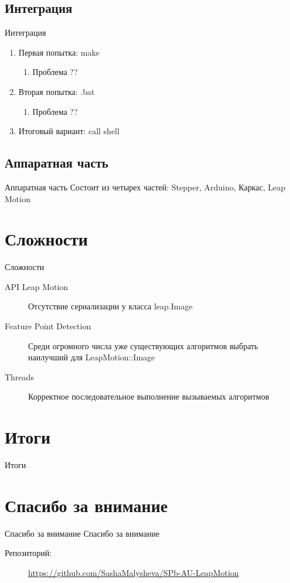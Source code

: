 \documentclass{beamer}
\newcommand{\cimg}[2]{%
	\begin{center}%
		\ifthenelse{\equal{#2}{}}{%
			\texttt{[image: \#1]}
		}{%
			\texttt{[image: \#1]}
		}%
	\end{center}%
}
\begin{document}
\subsection{Интеграция}
\begin{frame}[t]{Интеграция}
	\begin{enumerate}
		\item
		Первая попытка: make
		\begin{enumerate}
			\item Проблема ??
		\end{enumerate}

	\item
		Вторая попытка: .bat
		\begin{enumerate}
			\item Проблема ??
		\end{enumerate}

	\item
		Итоговый вариант: call shell
	\end{enumerate}
\end{frame}

\subsection{Аппаратная часть}
\begin{frame}[t]{Аппаратная часть}
		Состоит из четырех частей: Stepper, Arduino, Каркас, Leap Motion
		\cimg{03.png}{0.6}
\end{frame}

\section{Сложности}
\begin{frame}[t]{Сложности}
	\begin{description}
		\item[API Leap Motion]
			Отсутствие сериализации у класса leap.Image

		\item[Feature Point Detection]
			Среди огромного числа уже существующих алгоритмов выбрать наилучший для LeapMotion::Image
		\item[Threads]
			Корректное последовательное выполнение вызываемых алгоритмов
	\end{description}
\end{frame}

\section{Итоги}
\begin{frame}[t]{Итоги}
	\cimg{04.png}{0.9}
\end{frame}

\section{Спасибо за внимание}
\begin{frame}[t]{Спасибо за внимание}
	Спасибо за внимание
	\begin{description}
		\item[Репозиторий:]  \url{https://github.com/SashaMalysheva/SPb-AU-LeapMotion}
	\end{description}
\end{frame}
\end{document}
